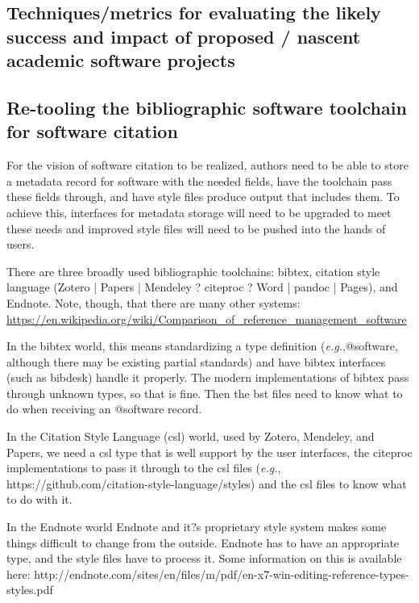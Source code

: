 \documentclass[a4paper,UKenglish]{dagman}
\newcommand{\eg}{\emph{e.g.},\xspace}
\begin{document}
\subsection{Techniques/metrics for evaluating the likely success and impact of proposed / nascent academic software projects}

\subsection{Re-tooling the bibliographic software toolchain for software citation}

For the vision of software citation to be realized, authors need to be able to store a metadata record for software with the needed fields, have the toolchain pass these fields through, and have style files produce output that includes them. To achieve this, interfaces for metadata storage will need to be upgraded to meet these needs and improved style files will need to be pushed into the hands of users.

There are three broadly used bibliographic toolchains: bibtex, citation style language (Zotero | Papers | Mendeley ? citeproc ? Word | pandoc | Pages), and Endnote. Note, though, that there are many other systems:
\url{https://en.wikipedia.org/wiki/Comparison_of_reference_management_software}

In the bibtex world, this means standardizing a type definition (\eg @software, although there may be existing partial standards) and have bibtex interfaces (such as bibdesk) handle it properly. The modern implementations of bibtex pass through unknown types, so that is fine. Then the bst files need to know what to do when receiving an @software record.

In the Citation Style Language (csl) world, used by Zotero, Mendeley, and Papers, we need a csl type that is well support by the user interfaces, the citeproc implementations to pass it through to the csl files (\eg https://github.com/citation-style-language/styles) and the csl files to know what to do with it.

In the Endnote world Endnote and it?s proprietary style system makes some things difficult to change from the outside. Endnote has to have an appropriate type, and the style files have to process it.  Some information on this is available here: http://endnote.com/sites/en/files/m/pdf/en-x7-win-editing-reference-types-styles.pdf
\end{document}
